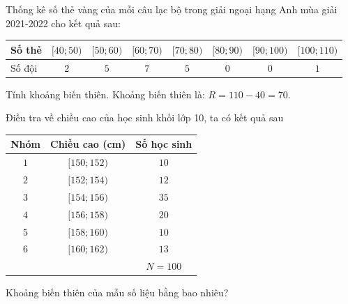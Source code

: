 \begin{bt}%
	Thống kê số thẻ vàng của mỗi câu lạc bộ trong giải ngoại hạng Anh mùa giải 2021-2022 cho kết quả sau:
	\begin{center}
		\begin{tabular}{|l|c|c|c|c|c|c|c|}
			\hline 
			Số thẻ & $[40 ; 50)$ & $[50 ; 60)$ & $[60 ; 70)$ & $[70 ; 80)$ & $[80 ; 90)$ & $[90 ; 100)$ & $[100 ; 110)$ \\
			\hline 
			Số đội & $2$ & $5$ & $7$ & $5$ & $0$ & $0$ & $1$ \\
			\hline
		\end{tabular}
	\end{center}
	Tính khoảng biến thiên.
	\loigiai
	{
		Khoảng biến thiên là: $R=110-40=70$.
	}
\end{bt}

\begin{bt}%
Điều tra về chiều cao của học sinh khối lớp 10, ta có kết quả sau
\begin{center}
\begin{tabular}{|c|c|c|}
\hline
\textbf{Nhóm} & \textbf{Chiều cao (cm)} & \textbf{Số học sinh} \\
\hline
$1$ & $[150;152)$ & $10$ \\
\hline
$2$ & $[152;154)$ & $12$ \\
\hline
$3$ & $[154;156)$ & $35$ \\
\hline
$4$ & $[156;158)$ & $20$ \\
\hline
$5$ & $[158;160)$ & $10$ \\
\hline
$6$ & $[160;162)$ & $13$ \\
\hline
&  & $N=100$ \\
\hline
\end{tabular}
\end{center}
Khoảng biến thiên của mẫu số liệu bằng bao nhiêu?
\end{bt}

